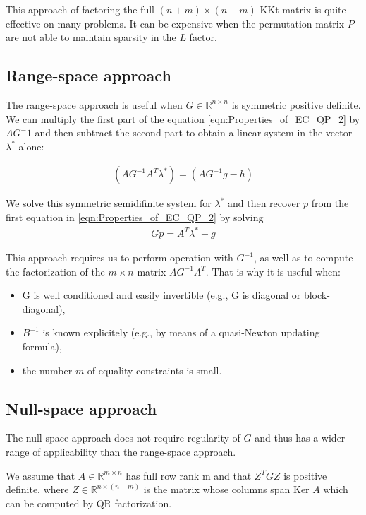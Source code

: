 This approach of factoring  the full $(n+m)\times (n+m)$ KKt matrix is quite effective  on many problems. It can be expensive when the permutation matrix $P$ are not able to maintain sparsity in the $L$ factor.
\subsection*{Range-space approach}
The range-space approach is useful when $G\in \mathbb{R}^{n\times n}$ is symmetric positive definite. We can multiply the first part of the equation \ref{eqn:Properties_of_EC_QP_2}  by $AG^-1$ and then subtract the second part to obtain a linear system in the vector $\lambda^*$ alone:

\begin{equation}
	\begin{aligned}
		(AG^{-1}A^T\lambda^*) = (AG^{-1}g-h)
	\end{aligned}
	\label{eqn:Range_space_1}
\end{equation}

We solve this symmetric semidifinite system for $\lambda^*$ and then recover $p$ from the first equation in \ref{eqn:Properties_of_EC_QP_2} by solving
\begin{equation}
	\begin{aligned}
		Gp = A^T\lambda^*-g
	\end{aligned}
	\label{eqn:Range_space_2}
\end{equation}

This approach requires us to perform operation with $G^{-1}$, as well as to compute the factorization of the $m\times n$ matrix $AG^{-1}A^T$. That is why it is useful when:
\begin{itemize}
	\item G is well conditioned and easily invertible (e.g., G is diagonal or block-diagonal),
	\item $B^{-1}$ is known explicitely (e.g., by means of a quasi-Newton updating formula),
	\item the number $m$ of equality constraints is small.
\end{itemize}

\subsection*{Null-space approach}
The null-space approach does not require regularity of $G$ and thus has a wider range of applicability than the range-space approach.

We assume that $A\in \mathbb{R}^{m\times n}$ has full row rank m and that $Z^TGZ$ is positive definite, where $Z\in \mathbb{R}^{n\times (n-m)}$ is the matrix whose columns span Ker $A$ which can be computed by QR factorization.

